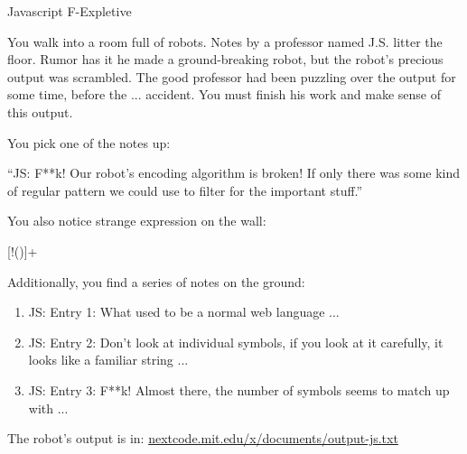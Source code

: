 \documentclass[12pt]{article}
\begin{document}
\Large

\vspace*{10px}
\begin{center}
\huge{Javascript F-Expletive}
\end{center}
\vspace*{10px}

\vspace{.2in}

You walk into a room full of robots. Notes by a professor named J.S. litter the floor. Rumor has it he made a ground-breaking robot, but the robot's precious output was scrambled. The good professor had been puzzling over the output for some time, before the ... accident. You must finish his work and make sense of this output.
\begin{center}
\underline{\hspace{1cm}} \underline{\hspace{1cm}} \underline{\hspace{1cm}} \underline{\hspace{1cm}} \underline{\hspace{1cm}} \underline{\hspace{1cm}} \underline{\hspace{1cm}} 
\end{center}

You pick one of the notes up:

\begin{center}
    ``JS: F**k! Our robot's encoding algorithm is broken! If only there was some kind of regular pattern we could use to filter for
    the important stuff.''
\end{center}

You also notice strange expression on the wall:

\begin{center}
    \LARGE{[!()]+}
\end{center}

Additionally, you find a series of notes on the ground:
\begin{enumerate}
    \item JS: Entry 1: What used to be a normal web language ...
    \item JS: Entry 2: Don't look at individual symbols, if you look at it carefully, it looks like a familiar string ...
    \item JS: Entry 3: F**k! Almost there, the number of symbols seems to match up with ...
\end{enumerate}

\vspace{.2in}

\Large{The robot's output is in: \underline{nextcode.mit.edu/x/documents/output-js.txt}}
\end{document}
